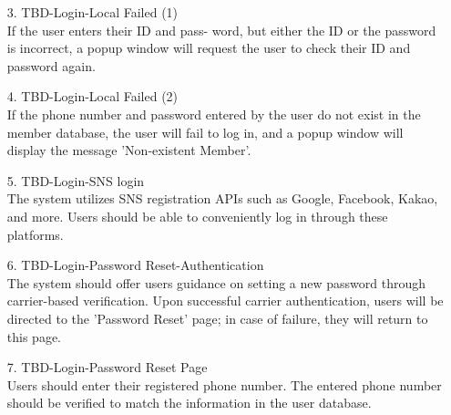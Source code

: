 \documentclass[conference]{IEEEtran}
\begin{document}
\begin{enumerate}
\begin{itemize}
\begin{itemize}
    \begin{enumerate}
        \item[3.] TBD-Login-Local Failed (1) \\
        If the user enters their ID and pass- word, but either the ID or the password is incorrect, a popup window will request the user to check their ID and password again. \\
    \end{enumerate}
    
    \begin{enumerate}
        \item[4.] TBD-Login-Local Failed (2) \\
        If the phone number and password entered by the user do not exist in the member database, the user will fail to log in, and a popup window will display the message ’Non-existent Member’. \\
    \end{enumerate}
    
    \begin{enumerate}
        \item[5.] TBD-Login-SNS login \\
        The system utilizes SNS registration APIs such as Google, Facebook, Kakao, and more. Users should be able to conveniently log in through these platforms. \\
    \end{enumerate}
    
    \begin{enumerate}
        \item[6.] TBD-Login-Password Reset-Authentication \\
        The system should offer users guidance on setting a new password through carrier-based verification. Upon successful carrier authentication, users will be directed to the ’Password Reset’ page; in case of failure, they will return to this page. \\
    \end{enumerate}
    
    \begin{enumerate}
        \item[7.] TBD-Login-Password Reset Page \\
        Users should enter their registered phone number. The entered phone number should be verified to match the information in the user database. \\
    \end{enumerate}
    

\end{itemize}
\end{itemize}
\end{enumerate}
\end{document}
